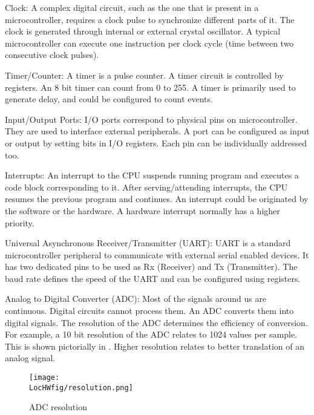 \begin{description}
\item {Clock:} A complex digital circuit, such as the one that is
  present in a microcontroller, requires a clock pulse to
  synchronize different parts of it.  The clock
  is generated through internal or external crystal oscillator. A
  typical microcontroller can execute one instruction per clock
  cycle (time between two consecutive clock pulses).

\item {Timer/Counter:} A timer is a pulse counter. A timer circuit is
  controlled by registers. An 8 bit timer can count from 0 to 255. A
  timer is primarily used to generate delay, and could be configured
  to count events.
    
\item{Input/Output Ports:} I/O ports correspond to physical pins on
  microcontroller. They are used to interface external peripherals. A
  port can be configured as input or output by setting bits in I/O
  registers. Each pin can be individually addressed too.

\item{Interrupts:} An interrupt to the CPU suspends running program
  and executes a code block corresponding to it. After serving/attending
  interrupts, the CPU resumes the previous program and continues. An
  interrupt could be originated by the software or the hardware. A
  hardware interrupt normally has a higher priority.

\item {Universal Asynchronous Receiver/Transmitter (UART):} UART is a
  standard microcontroller peripheral to communicate with external
  serial enabled devices. It has two dedicated pins to be used as
  Rx (Receiver) and Tx (Transmitter).  The baud rate defines the speed
  of the UART and can be configured using registers.

\item {Analog to Digital Converter (ADC):} Most of the signals around
  us are continuous. Digital circuits cannot process them. An ADC
  converts them into digital signals. The resolution of the ADC
  determines the efficiency of conversion. For example, a 10 bit
  resolution of the ADC relates to 1024 values per sample. This is
  shown pictorially in . Higher resolution relates
  to better translation of an analog signal.

\begin{figure}
  \centering
  \texttt{[image: \\LocHWfig/resolution.png]}
  \caption{ADC resolution}
  \label{resolution}
\end{figure}


\end{description}
